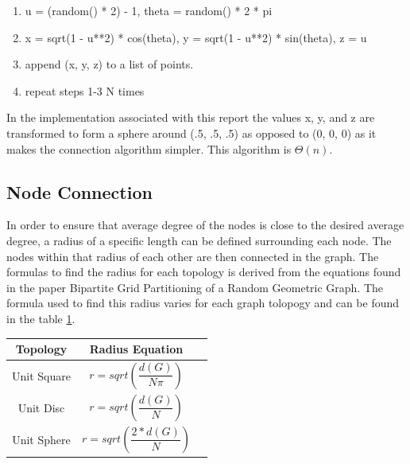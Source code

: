 \documentclass{article}
\begin{document}
    \begin{enumerate}
      \item u = (random() * 2) - 1, theta = random() * 2 * pi
      \item x = sqrt(1 - u**2) * cos(theta), y = sqrt(1 - u**2) * sin(theta), z = u
      \item append (x, y, z) to a list of points.
      \item repeat steps 1-3 N times
    \end{enumerate}

    In the implementation associated with this report the values x, y, and z are transformed to form a sphere around (.5, .5, .5) as opposed to (0, 0, 0) as it makes the connection algorithm simpler.
    This algorithm is $\Theta(n)$.

	\subsection{Node Connection}
		In order to ensure that average degree of the nodes is close to the desired average degree, a radius of a specific length can be defined surrounding each node.
    The nodes within that radius of each other are then connected in the graph.
		The formulas to find the radius for each topology is derived from the equations found in the paper Bipartite Grid Partitioning of a Random Geometric Graph\cite{chen2017bipartite}.
		The formula used to find this radius varies for each graph tolopogy and can be found in the table \ref{radius_equations}.

    \begin{table}
      \centering
      \label{radius_equations}
  		\begin{tabular}{ |c|c|c| }
  				\hline
  				Topology &  Radius Equation \\
  				\hline
  				Unit Square & $r = sqrt(\dfrac{d(G)}{N\pi})$ \\
  				\hline
  				Unit Disc & $r = sqrt(\dfrac{d(G)}{N})$ \\
  				\hline
  				Unit Sphere & $r = sqrt(\dfrac{2*d(G)}{N})$ \\
  				\hline
  		\end{tabular}
    \end{table}
\end{document}
